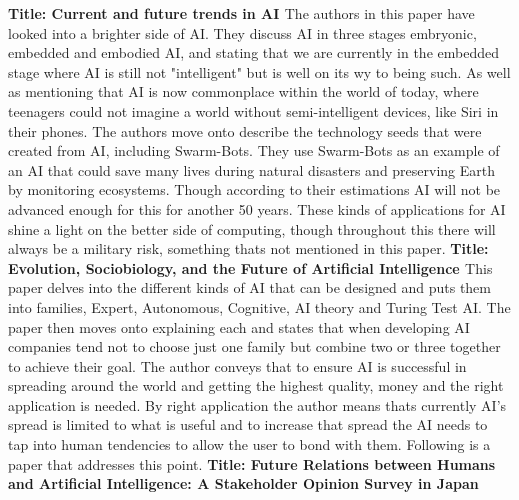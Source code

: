 \documentclass{scrartcl}
\begin{document}
	\newline
	\newline
	\newline
	\textbf{Title:  Current and future trends in AI \cite{Trends}}
	\newline
The authors in this paper have looked into a brighter side of AI. They discuss AI in three stages embryonic, embedded and embodied AI, and stating that we are currently in the embedded stage where AI is still not "intelligent" but is well on its wy to being such. As well as mentioning that AI is now commonplace within the world of today, where teenagers could not imagine a world without semi-intelligent devices, like Siri in their phones. The authors move onto describe the technology seeds that were created from AI, including Swarm-Bots. They use Swarm-Bots as an example of an AI that could save many lives during natural disasters and preserving Earth by monitoring ecosystems. Though according to their estimations AI will not be advanced enough for this for another 50 years. These kinds of applications for AI shine a light on the better side of computing, though throughout this there will always be a military risk, something thats not mentioned in this paper.
	\newline
	\newline
	\textbf{Title: Evolution, Sociobiology, and the Future of Artificial Intelligence \cite{Evolution}}
	\newline
This paper delves into the different kinds of AI that can be designed and puts them into families, Expert, Autonomous, Cognitive, AI theory and Turing Test AI. The paper then moves onto explaining each and states that when developing AI companies tend not to choose just one family but combine two or three together to achieve their goal. The author conveys that to ensure AI is successful in spreading around the world and getting the highest quality, money and the right application is needed. By right application the author means thats currently AI's spread is limited to what is useful and to increase that spread the AI needs to tap into human tendencies to allow the user to bond with them. Following is a paper that addresses this point.
	\newline
	\newline
	\newline
	\textbf{Title: Future Relations between Humans and Artificial Intelligence: A Stakeholder Opinion Survey in Japan \cite{Japan}}
	\newline
\end{document}
